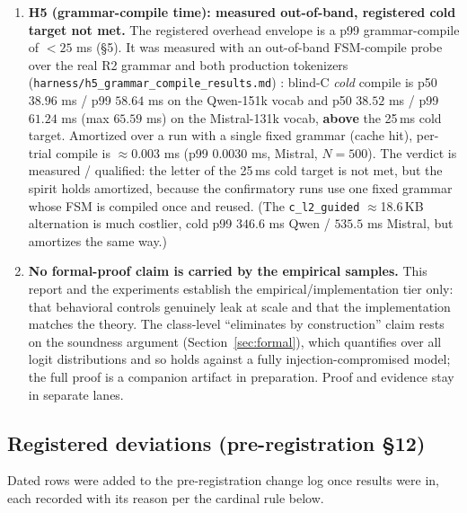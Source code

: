 \begin{enumerate}[leftmargin=*]
\item \textbf{H5 (grammar-compile time): measured out-of-band, registered cold target not met.} The registered overhead envelope is a p99 grammar-compile of \(< 25\) ms (\S5). It was measured with an out-of-band FSM-compile probe over the real R2 grammar and both production tokenizers (\texttt{harness/h5\_grammar\_compile\_results.md}) \cite{dong2024xgrammar}: blind-C \emph{cold} compile is p50 \(38.96\) ms / p99 \(58.64\) ms on the Qwen-151k vocab and p50 \(38.52\) ms / p99 \(61.24\) ms (max \(65.59\) ms) on the Mistral-131k vocab, \textbf{above} the 25\,ms cold target. Amortized over a run with a single fixed grammar (cache hit), per-trial compile is \(\approx\!0.003\) ms (p99 \(0.0030\) ms, Mistral, \(N=500\)). The verdict is measured / qualified: the letter of the 25\,ms cold target is not met, but the spirit holds amortized, because the confirmatory runs use one fixed grammar whose FSM is compiled once and reused. (The \texttt{c\_l2\_guided} \(\approx\)18.6\,KB alternation is much costlier, cold p99 \(346.6\) ms Qwen / \(535.5\) ms Mistral, but amortizes the same way.)

\item \textbf{No formal-proof claim is carried by the empirical samples.} This report and the experiments establish the empirical/implementation tier only: that behavioral controls genuinely leak at scale and that the implementation matches the theory. The class-level ``eliminates by construction'' claim rests on the soundness argument (Section~\ref{sec:formal}), which quantifies over all logit distributions and so holds against a fully injection-compromised model; the full proof is a companion artifact in preparation. Proof and evidence stay in separate lanes.

\end{enumerate}

\subsection{Registered deviations (pre-registration \S12)}
\label{sec:registered-deviations}

Dated rows were added to the pre-registration change log once results were in, each recorded with its reason per the cardinal rule below.

